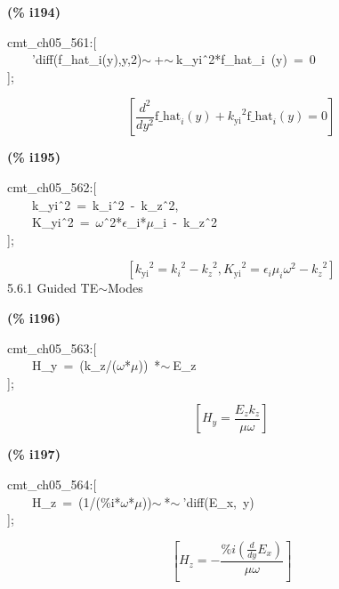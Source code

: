 \documentclass[fleqn]{article}
\begin{document}
\noindent
\begin{minipage}[t]{4.000000em}\color{red}\bfseries
(\% i194)	
\end{minipage}
\begin{minipage}[t]{\textwidth}\color{blue}
cmt\_ch05\_561:[\\
\ \ \ \ 'diff(f\_hat\_i(y),y,2)\ensuremath{\sim\ }+\ensuremath{\sim\ }k\_yi\^\ 2*f\_hat\_i\ (y)\ =\ 0\\
];
\end{minipage}
\[\displaystyle \tag{\% o194} 
\left[ \frac{{{d}^{2}}}{d {{y}^{2}}} {{\ensuremath{\mathrm{f\_ hat}}}_i}(y)+{{{k_{\ensuremath{\mathrm{yi}}}}}^{2}} {{\ensuremath{\mathrm{f\_ hat}}}_i}(y)=0\right] \mbox{}
\]


\noindent
\begin{minipage}[t]{4.000000em}\color{red}\bfseries
(\% i195)	
\end{minipage}
\begin{minipage}[t]{\textwidth}\color{blue}
cmt\_ch05\_562:[\\
\ \ \ \ k\_yi\^\ 2\ =\ k\_i\^\ 2\ -\ k\_z\^\ 2,\ \\
\ \ \ \ K\_yi\^\ 2\ =\ \ensuremath{\omega}\^\ 2*\ensuremath{\epsilon}\_i*\ensuremath{\mu}\_i\ -\ k\_z\^\ 2\\
];
\end{minipage}
\[\displaystyle \tag{\% o195} 
\left[ {{{k_{\ensuremath{\mathrm{yi}}}}}^{2}}={{{k_i}}^{2}}-{{{k_z}}^{2}}\operatorname{,}{{{K_{\ensuremath{\mathrm{yi}}}}}^{2}}={{\epsilon }_i} {{\mu }_i} {{\omega }^{2}}-{{{k_z}}^{2}}\right] \mbox{}
\]
5.6.1   Guided TE\ensuremath{\sim }Modes


\noindent
\begin{minipage}[t]{4.000000em}\color{red}\bfseries
(\% i196)	
\end{minipage}
\begin{minipage}[t]{\textwidth}\color{blue}
cmt\_ch05\_563:[\\
\ \ \ \ H\_y\ =\ (k\_z/(\ensuremath{\omega}*\ensuremath{\mu}))\ *\ensuremath{\sim\ }E\_z\\
];
\end{minipage}
\[\displaystyle \tag{\% o196} 
\left[ {H_y}=\frac{{E_z} {k_z}}{\mu  \omega }\right] \mbox{}
\]


\noindent
\begin{minipage}[t]{4.000000em}\color{red}\bfseries
(\% i197)	
\end{minipage}
\begin{minipage}[t]{\textwidth}\color{blue}
cmt\_ch05\_564:[\\
\ \ \ \ H\_z\ =\ (1/(\%i*\ensuremath{\omega}*\ensuremath{\mu}))\ensuremath{\sim\ }*\ensuremath{\sim\ }'diff(E\_x,\ y)\\
];
\end{minipage}
\[\displaystyle \tag{\% o197} 
\left[ {H_z}=-\frac{\% i \left( \frac{d}{d y} {E_x}\right) }{\mu  \omega }\right] \mbox{}
\]
\end{document}
